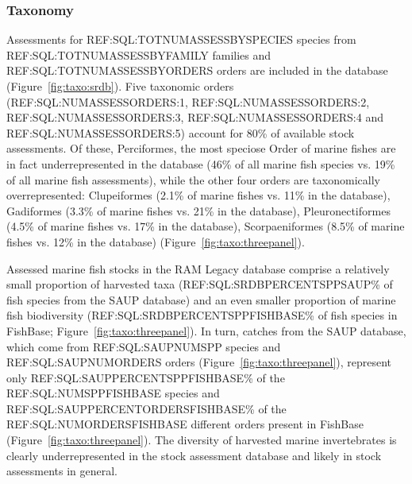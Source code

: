 
\subsubsection*{Taxonomy}

Assessments for REF:SQL:TOTNUMASSESSBYSPECIES species from
REF:SQL:TOTNUMASSESSBYFAMILY families and REF:SQL:TOTNUMASSESSBYORDERS
orders are included in the database (Figure~\ref{fig:taxo:srdb}). Five
taxonomic orders (REF:SQL:NUMASSESSORDERS:1,
REF:SQL:NUMASSESSORDERS:2, REF:SQL:NUMASSESSORDERS:3,
REF:SQL:NUMASSESSORDERS:4 and REF:SQL:NUMASSESSORDERS:5) account for
80\% of available stock assessments.  Of these, Perciformes, the most
speciose Order of marine fishes are in fact underrepresented in the
database (46\% of all marine fish species vs.  19\% of all marine
fish assessments), while the other four orders are
taxonomically overrepresented: Clupeiformes (2.1\% of marine fishes
vs.  11\% in the database), Gadiformes (3.3\% of marine fishes vs.
21\% in the database), Pleuronectiformes (4.5\% of marine fishes vs.
17\% in the database), Scorpaeniformes (8.5\% of marine fishes vs.
12\% in the database) (Figure~\ref{fig:taxo:threepanel}).

Assessed marine fish stocks in the RAM Legacy database comprise a
relatively small proportion of harvested taxa
(REF:SQL:SRDBPERCENTSPPSAUP\% of fish species from the SAUP database)
and an even smaller proportion of marine fish biodiversity
(REF:SQL:SRDBPERCENTSPPFISHBASE\% of fish species in FishBase;
Figure~\ref{fig:taxo:threepanel}). In turn, catches from the SAUP
database, which come from REF:SQL:SAUPNUMSPP species and
REF:SQL:SAUPNUMORDERS orders (Figure~\ref{fig:taxo:threepanel}),
represent only REF:SQL:SAUPPERCENTSPPFISHBASE\% of the
REF:SQL:NUMSPPFISHBASE species and REF:SQL:SAUPPERCENTORDERSFISHBASE\%
of the REF:SQL:NUMORDERSFISHBASE different orders present in FishBase
(Figure~\ref{fig:taxo:threepanel}). The diversity of harvested marine
invertebrates is clearly underrepresented in the stock assessment
database and likely in stock assessments in general.


